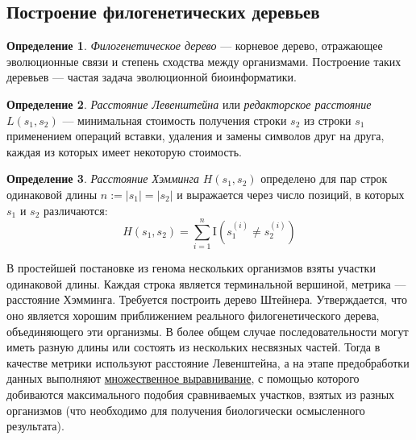 \documentclass[11pt,a4paper]{report}
\theoremstyle{definition}
\theoremstyle{definition}
\theoremstyle{definition}
\newtheorem{definition}{Определение}[section]
\begin{document}
	\subsection{Построение филогенетических деревьев}
	\begin{definition}
		\textit{Филогенетическое дерево} — корневое дерево, отражающее эволюционные связи и степень сходства между организмами. Построение таких деревьев — частая задача эволюционной биоинформатики.
	\end{definition}
	\begin{definition}
		\textit{Расстояние Левенштейна} или \textit{редакторское расстояние} $ L(s_1, s_2) $ — минимальная стоимость получения строки $s_2$ из строки $s_1$ применением операций вставки, удаления и замены символов друг на друга, каждая из которых имеет некоторую стоимость. 
	\end{definition}
	\begin{definition}
		\textit{Расстояние Хэмминга} $ H(s_1, s_2) $ определено для пар строк одинаковой длины $ n := |s_1| = |s_2| $ и выражается через число позиций, в которых $ s_1 $ и $ s_2 $ различаются: 
		$$
			H(s_1, s_2) = \sum_{i=1}^{n} \mathrm{I}\left (s_1^{(i)} \neq s_2^{(i)}\right )
		$$
	\end{definition} 
	\noindent В простейшей постановке из генома нескольких организмов взяты участки одинаковой длины. Каждая строка является терминальной вершиной, метрика — расстояние Хэмминга. Требуется построить дерево Штейнера. Утверждается, что оно является хорошим приближением реального филогенетического дерева, объединяющего эти организмы. В более общем случае последовательности могут иметь разную длины или состоять из нескольких несвязных частей. Тогда в качестве метрики используют расстояние Левенштейна, а на этапе предобработки данных выполняют \href{https://en.wikipedia.org/wiki/Sequence_alignment}{множественное выравнивание}, с помощью которого добиваются максимального подобия сравниваемых участков, взятых из разных организмов (что необходимо для получения биологически осмысленного результата).\\
	
\end{document}
